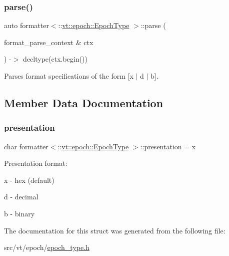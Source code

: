\subsubsection{\texorpdfstring{parse()}{parse()}}
{\footnotesize\ttfamily auto formatter$<$\+::\hyperlink{structvt_1_1epoch_1_1_epoch_type}{vt\+::epoch\+::\+Epoch\+Type} $>$\+::parse (\begin{DoxyParamCaption}\item[{format\+\_\+parse\+\_\+context \&}]{ctx }\end{DoxyParamCaption}) -\/$>$ decltype(ctx.\+begin()) \hspace{0.3cm}{\ttfamily [inline]}}



Parses format specifications of the form \mbox{[}\textquotesingle{}x\textquotesingle{} $\vert$ \textquotesingle{}d\textquotesingle{} $\vert$ \textquotesingle{}b\textquotesingle{}\mbox{]}. 



\subsection{Member Data Documentation}
\mbox{\label{structformatter_3_1_1vt_1_1epoch_1_1_epoch_type_01_4_a97209524e3ceb2d868c2b11d94f507c0}} 
\subsubsection{\texorpdfstring{presentation}{presentation}}
{\footnotesize\ttfamily char formatter$<$\+::\hyperlink{structvt_1_1epoch_1_1_epoch_type}{vt\+::epoch\+::\+Epoch\+Type} $>$\+::presentation = \textquotesingle{}x\textquotesingle{}}

Presentation format\+:
\begin{DoxyItemize}
\item \textquotesingle{}x\textquotesingle{} -\/ hex (default)
\item \textquotesingle{}d\textquotesingle{} -\/ decimal
\item \textquotesingle{}b\textquotesingle{} -\/ binary 
\end{DoxyItemize}

The documentation for this struct was generated from the following file\+:\begin{DoxyCompactItemize}
\item 
src/vt/epoch/\hyperlink{epoch__type_8h}{epoch\+\_\+type.\+h}\end{DoxyCompactItemize}
